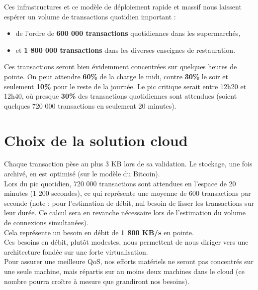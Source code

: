 Ces infrastructures et ce modèle de déploiement rapide et massif nous laissent
espérer un volume de transactions quotidien important :

\begin{itemize}
    \item de l'ordre de \textbf{600 000 transactions} quotidiennes dans les supermarchés,
    \item et \textbf{1 800 000 transactions} dans les diverses enseignes de restauration.
\end{itemize}

Ces transactions seront bien évidemment concentrées sur quelques heures de pointe.
On peut attendre \textbf{60\%} de la charge le midi, contre \textbf{30\%} le
soir et seulement \textbf{10\%} pour le reste de la journée. Le pic critique
serait entre 12h20 et 12h40, où presque \textbf{30\%} des transactions
quotidiennes sont attendues (soient quelques 720 000 transactions en seulement
20 minutes). \\

\section{Choix de la solution cloud}
\label{sec:choix-solution-cloud}

Chaque transaction pèse au plus 3 KB lors de sa validation. Le stockage,
une fois archivé, en est optimisé (sur le modèle du Bitcoin). \\

Lors du pic quotidien, 720 000 transactions sont attendues en l'espace de 20
minutes (1 200 secondes), ce qui représente une moyenne de 600 transactions
par seconde (note : pour l'estimation de débit, nul besoin de lisser les
transactions sur leur durée. Ce calcul sera en revanche nécessaire lors
de l'estimation du volume de connexions simultanées). \\

Cela représente un besoin en débit de \textbf{1 800 KB/s} en pointe. \\

Ces besoins en débit, plutôt modestes, nous permettent de nous diriger
vers une architecture fondée sur une forte virtualisation. \\

Pour assurer une meilleure QoS, nos efforts matériels ne seront pas concentrés
sur une seule machine, mais répartis sur au moins deux machines dans le cloud
(ce nombre pourra croître à mesure que grandiront nos besoins).

